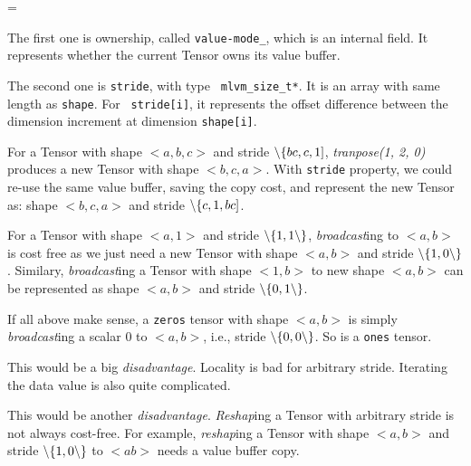 {\leftskip=\descindent

  The first one is ownership, called {\tt value-mode\_},
  which is an internal field. It represents whether the current Tensor owns its
  value buffer.

  The second one is {\tt stride}, with type {\tt
  mlvm\_size\_t*}.  It is an array with same length as {\tt shape}. For {\tt
  stride[i]}, it represents the offset difference between the dimension
  increment at dimension {\tt shape[i]}.

  {\leftskip

    For a Tensor with shape $<a,b, c>$ and stride
    $\backslash\{ bc, c, 1]$, {\it tranpose(1, 2, 0)} produces a new Tensor with
    shape $<b, c, a>$. With {\tt stride} property, we could re-use the same
    value buffer, saving the copy cost, and represent the new Tensor as: shape
    $<b, c, a>$ and stride $\backslash\{ c, 1, bc]$.

    For a Tensor with shape $<a, 1>$ and stride
    $\backslash\{ 1, 1\backslash\}$, {\it broadcast\/}ing to $<a,b>$ is cost free
    as we just need a new Tensor with shape $<a,b>$ and stride $\backslash\{ 1,
    0\backslash\}$. Similary, {\it broadcast\/}ing a Tensor with shape $<1, b>$
    to new shape $<a,b>$ can be represented as shape $<a,b>$ and stride
    $\backslash\{ 0, 1\backslash\}$.

    If all above make sense, a {\tt zeros} tensor with shape
    $<a,b>$ is simply {\it broadcast\/}ing a scalar $0$ to $<a,b>$, i.e., stride
    $\backslash\{ 0, 0\backslash\}$. So is a {\tt ones} tensor.

    This would be a big {\it disadvantage}.  Locality is
    bad for arbitrary stride. Iterating the data value is also quite
    complicated.

    This would be another {\it disadvantage}.  {\it
    Reshap\/}ing a Tensor with arbitrary stride is not always cost-free.  For
    example, {\it reshap\/}ing a Tensor with shape $<a,b>$ and stride
    $\backslash\{ 1, 0\backslash\}$ to $<ab>$ needs a value buffer copy.

  \par}
\par}

\bye
